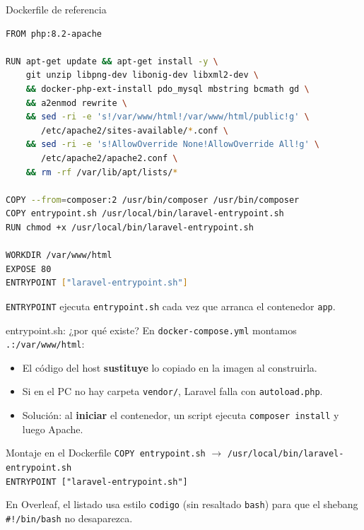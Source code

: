 \documentclass[aspectratio=169,10pt]{beamer}
\begin{document}
\begin{frame}[fragile]{Dockerfile de referencia}
\begin{lstlisting}[language=bash,basicstyle=\ttfamily\scriptsize]
FROM php:8.2-apache

RUN apt-get update && apt-get install -y \
    git unzip libpng-dev libonig-dev libxml2-dev \
    && docker-php-ext-install pdo_mysql mbstring bcmath gd \
    && a2enmod rewrite \
    && sed -ri -e 's!/var/www/html!/var/www/html/public!g' \
       /etc/apache2/sites-available/*.conf \
    && sed -ri -e 's!AllowOverride None!AllowOverride All!g' \
       /etc/apache2/apache2.conf \
    && rm -rf /var/lib/apt/lists/*

COPY --from=composer:2 /usr/bin/composer /usr/bin/composer
COPY entrypoint.sh /usr/local/bin/laravel-entrypoint.sh
RUN chmod +x /usr/local/bin/laravel-entrypoint.sh

WORKDIR /var/www/html
EXPOSE 80
ENTRYPOINT ["laravel-entrypoint.sh"]
\end{lstlisting}
  \small \texttt{ENTRYPOINT} ejecuta \texttt{entrypoint.sh} cada vez que arranca el contenedor \texttt{app}.
\end{frame}

\begin{frame}{entrypoint.sh: ¿por qué existe?}
  En \texttt{docker-compose.yml} montamos \texttt{.:/var/www/html}:
  \begin{itemize}
    \item El código del host \textbf{sustituye} lo copiado en la imagen al construirla.
    \item Si en el PC no hay carpeta \texttt{vendor/}, Laravel falla con \texttt{autoload.php}.
    \item Solución: al \textbf{iniciar} el contenedor, un script ejecuta \texttt{composer install} y luego Apache.
  \end{itemize}
  \vspace{0.4em}
  \begin{block}{Montaje en el Dockerfile}
    \texttt{COPY entrypoint.sh} $\rightarrow$ \texttt{/usr/local/bin/laravel-entrypoint.sh} \\
    \texttt{ENTRYPOINT ["laravel-entrypoint.sh"]}
  \end{block}
  \vspace{0.3em}
  \small En Overleaf, el listado usa estilo \texttt{codigo} (sin resaltado \texttt{bash}) para que el shebang \texttt{\#!/bin/bash} no desaparezca.
\end{frame}
\end{document}
